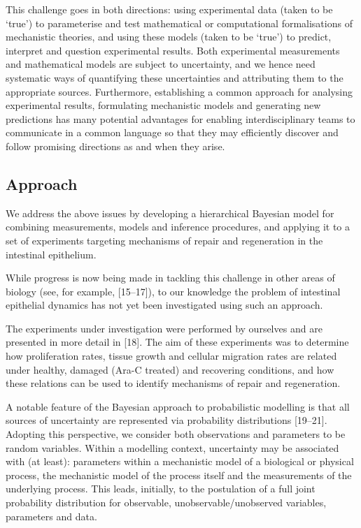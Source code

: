 \documentclass[10pt,letterpaper]{article}
\begin{document}
This challenge goes in both directions: using experimental data (taken
to be `true') to parameterise and test mathematical or computational
formalisations of mechanistic theories, and using these models (taken to
be `true') to predict, interpret and question experimental results. Both
experimental measurements and mathematical models are subject to
uncertainty, and we hence need systematic ways of quantifying these
uncertainties and attributing them to the appropriate sources.
Furthermore, establishing a common approach for analysing experimental
results, formulating mechanistic models and generating new predictions
has many potential advantages for enabling interdisciplinary teams to
communicate in a common language so that they may efficiently discover
and follow promising directions as and when they arise.

\subsection{Approach}\label{approach}

We address the above issues by developing a hierarchical Bayesian model
for combining measurements, models and inference procedures, and
applying it to a set of experiments targeting mechanisms of repair and
regeneration in the intestinal epithelium.

While progress is now being made in tackling this challenge in other
areas of biology (see, for example, {[}15--17{]}), to our knowledge the
problem of intestinal epithelial dynamics has not yet been investigated
using such an approach.

The experiments under investigation were performed by ourselves and are
presented in more detail in {[}18{]}. The aim of these experiments was
to determine how proliferation rates, tissue growth and cellular
migration rates are related under healthy, damaged (Ara-C treated) and
recovering conditions, and how these relations can be used to identify
mechanisms of repair and regeneration.

A notable feature of the Bayesian approach to probabilistic modelling is
that all sources of uncertainty are represented via probability
distributions {[}19--21{]}. Adopting this perspective, we consider both
observations and parameters to be random variables. Within a modelling
context, uncertainty may be associated with (at least): parameters
within a mechanistic model of a biological or physical process, the
mechanistic model of the process itself and the measurements of the
underlying process. This leads, initially, to the postulation of a full
joint probability distribution for observable, unobservable/unobserved
variables, parameters and data.
\end{document}
